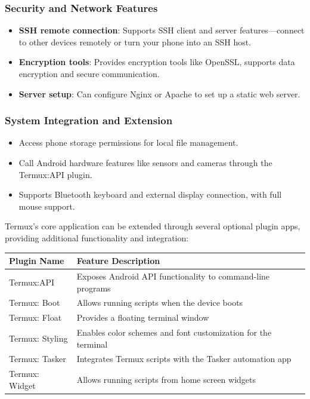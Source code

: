 \subsubsection*{Security and Network Features}

\begin{itemize}
  \item \textbf{SSH remote connection}: Supports SSH client and server features—connect to other devices remotely or turn your phone into an SSH host.
  \item \textbf{Encryption tools}: Provides encryption tools like OpenSSL, supports data encryption and secure communication.
  \item \textbf{Server setup}: Can configure Nginx or Apache to set up a static web server.
\end{itemize}

\subsubsection*{System Integration and Extension}

\begin{itemize}
  \item Access phone storage permissions for local file management.
  \item Call Android hardware features like sensors and cameras through the Termux:API plugin.
  \item Supports Bluetooth keyboard and external display connection, with full mouse support.
\end{itemize}


Termux's core application can be extended through several optional plugin apps, providing additional functionality and integration:

\begin{center}
\begin{tabularx}{\linewidth}{|X|X|}
\hline
\textbf{Plugin Name} & \textbf{Feature Description} \tabularnewline
\hline
Termux:API & Exposes Android API functionality to command-line programs \tabularnewline
Termux: Boot & Allows running scripts when the device boots \tabularnewline
Termux: Float & Provides a floating terminal window \tabularnewline
Termux: Styling & Enables color schemes and font customization for the terminal \tabularnewline
Termux: Tasker & Integrates Termux scripts with the Tasker automation app \tabularnewline
Termux: Widget & Allows running scripts from home screen widgets \tabularnewline
\hline
\end{tabularx}
\end{center}

